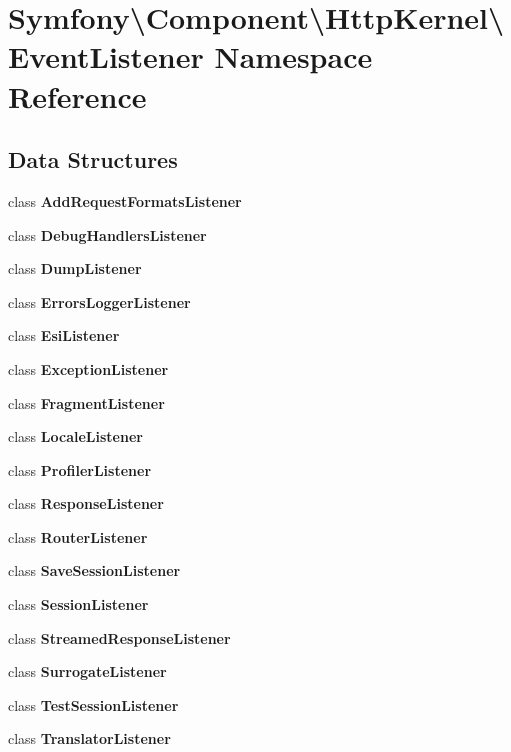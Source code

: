 \section{Symfony\textbackslash{}Component\textbackslash{}Http\+Kernel\textbackslash{}Event\+Listener Namespace Reference}
\label{namespace_symfony_1_1_component_1_1_http_kernel_1_1_event_listener}
\subsection*{Data Structures}
\begin{DoxyCompactItemize}
\item 
class {\bf Add\+Request\+Formats\+Listener}
\item 
class {\bf Debug\+Handlers\+Listener}
\item 
class {\bf Dump\+Listener}
\item 
class {\bf Errors\+Logger\+Listener}
\item 
class {\bf Esi\+Listener}
\item 
class {\bf Exception\+Listener}
\item 
class {\bf Fragment\+Listener}
\item 
class {\bf Locale\+Listener}
\item 
class {\bf Profiler\+Listener}
\item 
class {\bf Response\+Listener}
\item 
class {\bf Router\+Listener}
\item 
class {\bf Save\+Session\+Listener}
\item 
class {\bf Session\+Listener}
\item 
class {\bf Streamed\+Response\+Listener}
\item 
class {\bf Surrogate\+Listener}
\item 
class {\bf Test\+Session\+Listener}
\item 
class {\bf Translator\+Listener}
\end{DoxyCompactItemize}

